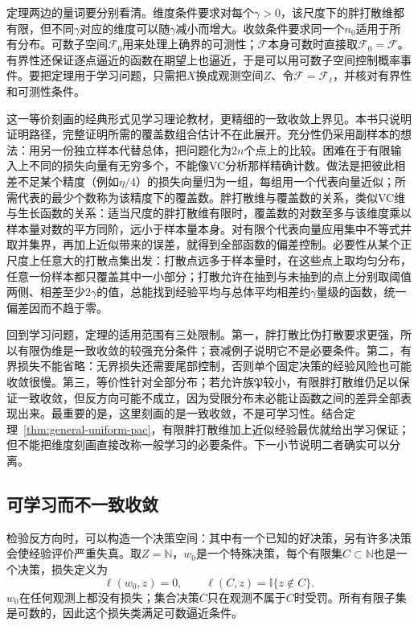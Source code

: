 定理两边的量词要分别看清。维度条件要求对每个$\gamma>0$，该尺度下的胖打散维都有限，但不同$\gamma$对应的维度可以随$\gamma$减小而增大。收敛条件要求同一个$n_0$适用于所有分布。可数子空间$\mathcal F_0$用来处理上确界的可测性；$\mathcal F$本身可数时直接取$\mathcal F_0=\mathcal F$。有界性还保证逐点逼近的函数在期望上也逼近，于是可以用可数子空间控制概率事件。要把定理用于学习问题，只需把$X$换成观测空间$Z$、令$\mathcal F=\mathcal F_\ell$，并核对有界性和可测性条件。

这一等价刻画的经典形式见学习理论教材，更精细的一致收敛上界见。本书只说明证明路径，完整证明所需的覆盖数组合估计不在此展开。充分性仍采用副样本的想法：用另一份独立样本代替总体，把问题化为$2n$个点上的比较。困难在于有限输入上不同的损失向量有无穷多个，不能像VC分析那样精确计数。做法是把彼此相差不足某个精度（例如$\eta/4$）的损失向量归为一组，每组用一个代表向量近似；所需代表的最少个数称为该精度下的覆盖数。胖打散维与覆盖数的关系，类似VC维与生长函数的关系：适当尺度的胖打散维有限时，覆盖数的对数至多与该维度乘以样本量对数的平方同阶，远小于样本量本身。对有限个代表向量应用集中不等式并取并集界，再加上近似带来的误差，就得到全部函数的偏差控制。必要性从某个正尺度上任意大的打散点集出发：打散点远多于样本量时，在这些点上取均匀分布，任意一份样本都只覆盖其中一小部分；打散允许在抽到与未抽到的点上分别取阈值两侧、相差至少$2\gamma$的值，总能找到经验平均与总体平均相差约$\gamma$量级的函数，统一偏差因而不趋于零。

回到学习问题，定理的适用范围有三处限制。第一，胖打散比伪打散要求更强，所以有限伪维是一致收敛的较强充分条件；衰减例子说明它不是必要条件。第二，有界损失不能省略：无界损失还需要尾部控制，否则单个固定决策的经验风险也可能收敛很慢。第三，等价性针对全部分布；若允许族$\mathfrak P$较小，有限胖打散维仍足以保证一致收敛，但反方向可能不成立，因为受限分布未必能让函数之间的差异全部表现出来。最重要的是，这里刻画的是一致收敛，不是可学习性。结合定理~\ref{thm:general-uniform-pac}，有限胖打散维加上近似经验最优就给出学习保证；但不能把维度刻画直接改称一般学习的必要条件。下一小节说明二者确实可以分离。

\subsection{可学习而不一致收敛}

检验反方向时，可以构造一个决策空间：其中有一个已知的好决策，另有许多决策会使经验评价严重失真。取$Z=\mathbb N$，$w_0$是一个特殊决策，每个有限集$C\subset\mathbb N$也是一个决策，损失定义为
\[
 \ell(w_0,z)=0,\qquad \ell(C,z)=\mathbb I\{z\notin C\}.
\]
$w_0$在任何观测上都没有损失；集合决策$C$只在观测不属于$C$时受罚。所有有限子集是可数的，因此这个损失类满足可数逼近条件。

